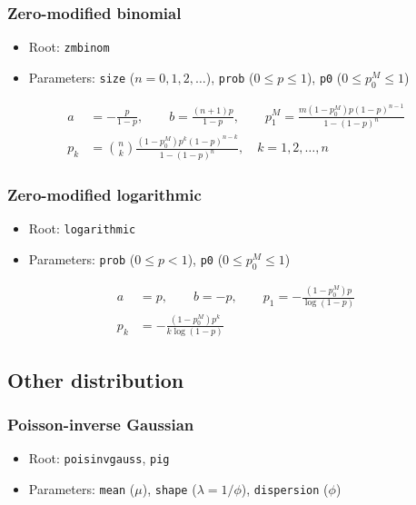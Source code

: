 \documentclass[x11names]{article}
\newcommand{\code}[1]{\texttt{#1}}
\begin{document}
\subsubsection{Zero-modified binomial}

\begin{itemize}
\item Root: \code{zmbinom}
\item Parameters: \code{size} ($n = 0, 1, 2, \dots$),
  \code{prob} ($0 \leq p \leq 1$),
  \code{p0} ($0 \leq p_0^M \leq 1$)
\end{itemize}
\begin{align*}
  a &= -\frac{p}{1 - p}, \qquad b = \frac{(n + 1)p}{1 - p}, \qquad
      p_1^M = \frac{m (1 - p_0^M) p (1 - p)^{n - 1}}{1 - (1 - p)^n} \\
  p_k &= \binom{n}{k} \frac{(1 - p_0^M) p^k (1 - p)^{n - k}}{1 - (1 - p)^n}, \quad
        k = 1, 2, \dots, n
\end{align*}

\subsubsection{Zero-modified logarithmic}

\begin{itemize}
\item Root: \code{logarithmic}
\item Parameters: \code{prob} ($0 \leq p < 1$),
  \code{p0} ($0 \leq p_0^M \leq 1$)
\end{itemize}
\begin{align*}
  a &= p, \qquad b = -p, \qquad
      p_1 = - \frac{(1 - p_0^M) p}{\log (1 - p)} \\
  p_k &= - \frac{(1 - p_0^M) p^k}{k \log (1 - p)}
\end{align*}


\subsection{Other distribution}

\subsubsection{Poisson-inverse Gaussian}
\label{sec:app:discrete:pig}

\begin{itemize}
\item Root: \code{poisinvgauss}, \code{pig}
\item Parameters: \code{mean} ($\mu$),
  \code{shape} ($\lambda = 1/\phi$),
  \code{dispersion} ($\phi$)
\end{itemize}
\medskip
\end{document}
